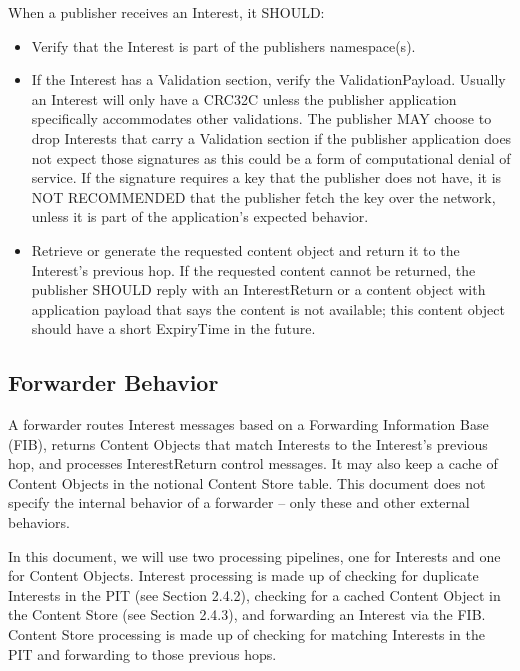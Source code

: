 \documentclass[12pt]{article}
\begin{document}
When a publisher receives an Interest, it SHOULD:

\begin{itemize}
\item Verify that the Interest is part of the publishers namespace(s).

\item If the Interest has a Validation section, verify the
    ValidationPayload.  Usually an Interest will only have a CRC32C
    unless the publisher application specifically accommodates other
    validations.  The publisher MAY choose to drop Interests that
    carry a Validation section if the publisher application does not
    expect those signatures as this could be a form of computational
    denial of service.  If the signature requires a key that the
    publisher does not have, it is NOT RECOMMENDED that the publisher
    fetch the key over the network, unless it is part of the
    application's expected behavior.

\item Retrieve or generate the requested content object and return it to
    the Interest's previous hop.  If the requested content cannot be
    returned, the publisher SHOULD reply with an InterestReturn or a
    content object with application payload that says the content is
    not available; this content object should have a short ExpiryTime
    in the future.
\end{itemize}

\subsection{Forwarder Behavior}
A forwarder routes Interest messages based on a Forwarding
Information Base (FIB), returns Content Objects that match Interests
to the Interest's previous hop, and processes InterestReturn control
messages.  It may also keep a cache of Content Objects in the
notional Content Store table.  This document does not specify the
internal behavior of a forwarder -- only these and other external
behaviors.

In this document, we will use two processing pipelines, one for
Interests and one for Content Objects.  Interest processing is made
up of checking for duplicate Interests in the PIT (see
Section 2.4.2), checking for a cached Content Object in the Content
Store (see Section 2.4.3), and forwarding an Interest via the FIB.
Content Store processing is made up of checking for matching
Interests in the PIT and forwarding to those previous hops.
\end{document}
